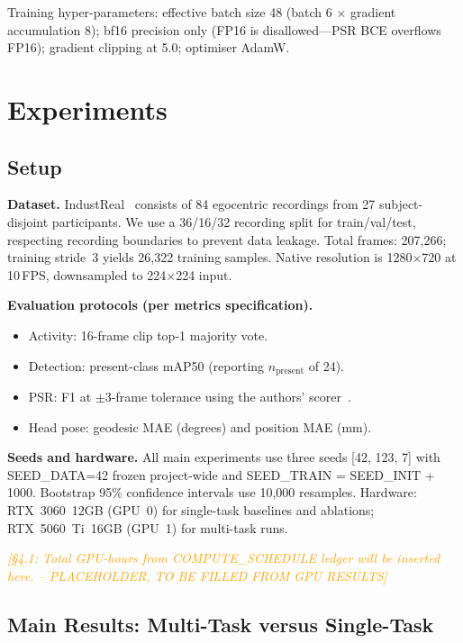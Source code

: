 \documentclass[conference]{IEEEtran}
\newcommand{\resultplaceholder}[1]{\textcolor{orange}{\emph{[#1 -- PLACEHOLDER, TO BE FILLED FROM GPU RESULTS]}}}
\begin{document}
Training hyper-parameters: effective batch size 48 (batch 6 $\times$ gradient accumulation 8); bf16 precision only (FP16 is disallowed---PSR BCE overflows FP16); gradient clipping at 5.0; optimiser AdamW.

\section{Experiments}
\label{sec:experiments}

\subsection{Setup}
\label{sec:setup}

\textbf{Dataset.} IndustReal~\cite{schoonbeek2024industreal} consists of 84 egocentric recordings from 27 subject-disjoint participants. We use a 36/16/32 recording split for train/val/test, respecting recording boundaries to prevent data leakage. Total frames: 207,266; training stride~3 yields 26,322 training samples. Native resolution is 1280$\times$720 at 10\,FPS, downsampled to 224$\times$224 input.

\textbf{Evaluation protocols (per metrics specification).}
\begin{itemize}
    \item Activity: 16-frame clip top-1 majority vote.
    \item Detection: present-class mAP50 (reporting $n_{\text{present}}$ of 24).
    \item PSR: F1 at $\pm$3-frame tolerance using the authors' scorer~\cite{schoonbeek2024industreal}.
    \item Head pose: geodesic MAE (degrees) and position MAE (mm).
\end{itemize}

\textbf{Seeds and hardware.} All main experiments use three seeds [42, 123, 7] with SEED\_DATA=42 frozen project-wide and SEED\_TRAIN = SEED\_INIT + 1000. Bootstrap 95\% confidence intervals use 10,000 resamples. Hardware: RTX~3060~12GB (GPU~0) for single-task baselines and ablations; RTX~5060~Ti~16GB (GPU~1) for multi-task runs.

\resultplaceholder{§4.1: Total GPU-hours from COMPUTE\_SCHEDULE ledger will be inserted here.}

\subsection{Main Results: Multi-Task versus Single-Task}
\label{sec:main_results}
\end{document}
